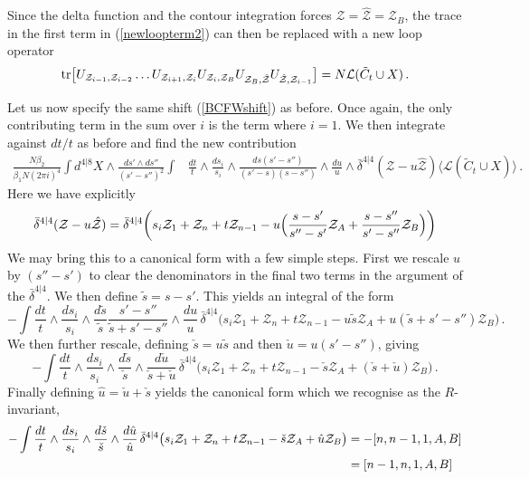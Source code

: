 \documentclass[12pt]{article}
\def \be  {\begin{equation}}
\def \ee  {\end{equation}}
\def \tr {\mathop{\rm tr}\nolimits}
\numberwithin{equation}{section}
\begin{document}
Since the delta function and the contour integration forces $\mathcal{Z} = \hat{\mathcal{Z}} = \mathcal{Z}_B$, the trace in the first term in (\ref{newloopterm2}) can then be replaced with a new loop operator
\be
\tr \bigl[ U_{\mathcal{Z}_{i-1},\mathcal{Z}_{i-2}} \ldots U_{\mathcal{Z}_{i+1},\mathcal{Z}_{i}} U_{\mathcal{Z}_{i},\mathcal{Z}_B} U_{\mathcal{Z}_B,\hat{\mathcal{Z}}}U_{\hat{\mathcal{Z}},\mathcal{Z}_{i-1}} \bigr] = N \mathcal{L}(\tilde{C}_t \cup X) \,.
\ee

Let us now specify the same shift (\ref{BCFWshift}) as before. Once again, the only contributing term in the sum over $i$ is the term where $i=1$.
We then integrate against $dt/t$ as before and find the new contribution 
\begin{align}
    \frac{N \beta_2}{\beta_1 N (2 \pi i)^4} \int d^{4|8}X \wedge \frac{ds' \wedge ds''}{(s'-s'')^2} \int &\frac{dt}{t}\wedge\frac{ds_i}{s_i} \wedge \frac{ds (s'-s'')}{(s'-s)(s-s'')} \wedge \frac{du}{u} \wedge \bar{\delta}^{4|4}(\mathcal{Z} - u \hat{\mathcal{Z}}) \langle \mathcal{L}(\tilde{C}_t \cup X) \rangle \,.
\end{align}
Here we have explicitly
\be
\bar{\delta}^{4|4}(\mathcal{Z} - u \hat{\mathcal{Z}}) = \bar{\delta}^{4|4}\biggl(s_i \mathcal{Z}_1 + \mathcal{Z}_n + t \mathcal{Z}_{n-1} - u \Bigl(\frac{s-s'}{s''-s'}\mathcal{Z}_A + \frac{s-s''}{s'-s''}\mathcal{Z}_B\Bigr)\biggr)
\ee
We may bring this to a canonical form with a few simple steps. First we rescale $u$ by $(s''-s')$ to clear the denominators in the final two terms in the argument of the $\bar{\delta}^{4|4}$. We then define $\tilde{s} = s-s'$. This yields an integral of the form
\be
-\int \frac{dt}{t} \wedge \frac{ds_i}{s_i} \wedge \frac{d \tilde{s}}{\tilde{s}} \frac{s'-s''}{\tilde{s}+s'-s''} \wedge \frac{du}{u} \, \bar{\delta}^{4|4}\bigl(s_i \mathcal{Z}_1 + \mathcal{Z}_n + t \mathcal{Z}_{n-1} - u \tilde{s} \mathcal{Z}_A + u(\tilde{s}+s'-s'')\mathcal{Z}_B\bigr)\,.
\ee
We then further rescale, defining $\check{s} = u \tilde{s}$ and then $\check{u} = u (s'-s'')$, giving
\be
-\int \frac{dt}{t} \wedge \frac{ds_i}{s_i} \wedge \frac{d \check{s}}{\check{s}} \wedge \frac{d\check{u}}{\check{s}+\check{u}} \, \bar{\delta}^{4|4}\bigl(s_i \mathcal{Z}_1 + \mathcal{Z}_n + t \mathcal{Z}_{n-1} -  \check{s} \mathcal{Z}_A + (\check{s}+\check{u})\mathcal{Z}_B\bigr)\,.
\ee
Finally defining $\hat{u} = \check{u} + \check{s}$ yields the canonical form which we recognise as the $R$-invariant,
\begin{align}
-\int \frac{dt}{t} \wedge \frac{ds_i}{s_i} \wedge \frac{d \check{s}}{\check{s}} \wedge \frac{d\hat{u}}{\hat{u}} \, \bar{\delta}^{4|4}\bigl(s_i \mathcal{Z}_1 + \mathcal{Z}_n + t \mathcal{Z}_{n-1} -  \check{s} \mathcal{Z}_A + \hat{u}\mathcal{Z}_B\bigr) &= -[n,n-1,1,A,B] \notag \\
&= [n-1,n,1,A,B]
\end{align}
\end{document}
